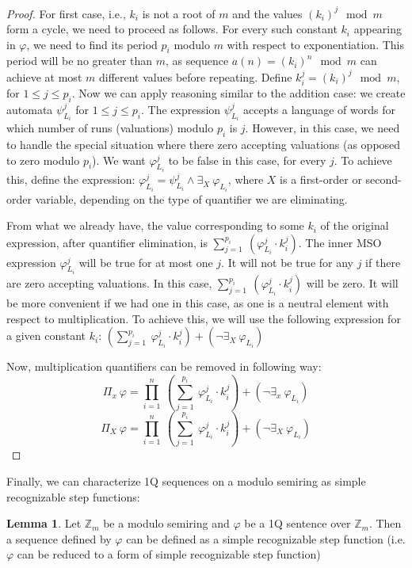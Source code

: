 \documentclass[12pt]{article}
\theoremstyle{definition}
\newtheorem{lemma}[theorem]{Lemma}
\begin{document}
\begin{proof}
    For first case, i.e., $k_i$ is not a root of $m$ and the values $(k_i)^j \mod m$ form a cycle, we need to proceed as follows. For every such constant $k_i$ appearing in $\varphi$, we need to find its period $p_i$ modulo $m$ with respect to exponentiation. This period will be no greater than $m$, as sequence $a(n) = (k_i)^n \mod m$ can achieve at most $m$ different values before repeating. Define $k_i^j = (k_i)^j \mod m$, for $1 \leq j \leq p_i$. Now we can apply reasoning similar to the addition case: we create automata $\psi_{L_i}^{j}$ for $1 \leq j \leq p_i$. The expression $\psi_{L_i}^{j}$ accepts a language of words for which number of runs (valuations) modulo $p_i$ is $j$. However, in this case, we need to handle the special situation where there zero accepting valuations (as opposed to zero modulo $p_i$). We want $\varphi_{L_i}^j$ to be false in this case, for every $j$. To achieve this, define the expression: $\varphi_{L_i}^j = \psi_{L_i}^{j} \land \exists_{X} \ \varphi_{L_i}$, where $X$ is a first-order or second-order variable, depending on the type of quantifier we are eliminating.

    From what we already have, the value corresponding to some $k_i$ of the original expression, after quantifier elimination, is $\sum_{j = 1}^{p_i} \ (\varphi_{L_i}^j \cdot k_i^j)$. The inner MSO expression $\varphi_{L_i}^j$ will be true for at most one $j$. It will not be true for any $j$ if there are zero accepting valuations. In this case, $\sum_{j = 1}^{p_i} \ (\varphi_{L_i}^j \cdot k_i^j)$ will be zero. It will be more convenient if we had one in this case, as one is a neutral element with respect to multiplication. To achieve this, we will use the following expression for a given constant $k_i$: $(\sum_{j = 1}^{p_i} \ \varphi_{L_i}^j \cdot k_i^j) + (\neg \exists_X \ \varphi_{L_i})$
    
    Now, multiplication quantifiers can be removed in following way:
    $$\Pi_x \ \varphi = \prod_{i = 1}^n \ (\sum_{j = 1}^{p_i} \ \varphi_{L_i}^j \cdot k_i^j) + (\neg \exists_x \ \varphi_{L_i})$$
    $$\Pi_X \ \varphi = \prod_{i = 1}^n \ (\sum_{j = 1}^{p_i} \ \varphi_{L_i}^j \cdot k_i^j) + (\neg \exists_X \ \varphi_{L_i})$$
\end{proof}

Finally, we can characterize 1Q sequences on a modulo semiring as simple recognizable step functions:

\begin{lemma}
    \label{OverModAreSimpleRec}
    Let $\mathbb{Z}_m$ be a modulo semiring and $\varphi$ be a 1Q sentence over $\mathbb{Z}_m$. Then a sequence defined by $\varphi$ can be defined as a simple recognizable step function (i.e. $\varphi$ can be reduced to a form of simple recognizable step function) 
\end{lemma}
\end{document}
